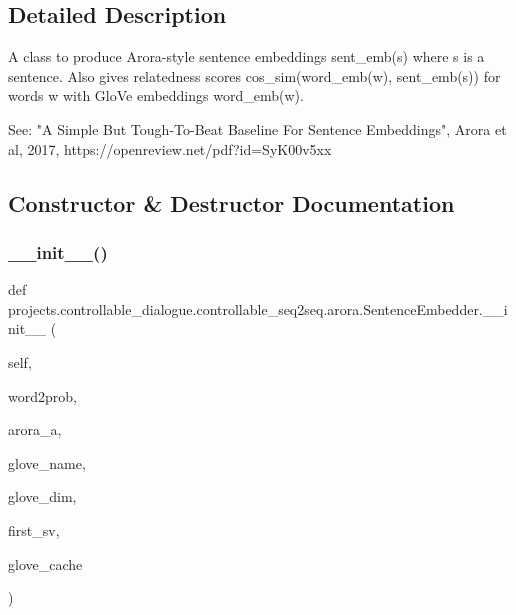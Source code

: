 \subsection{Detailed Description}
\begin{DoxyVerb}A class to produce Arora-style sentence embeddings sent_emb(s) where s is a
sentence. Also gives relatedness scores cos_sim(word_emb(w), sent_emb(s)) for words
w with GloVe embeddings word_emb(w).

See: "A Simple But Tough-To-Beat Baseline For Sentence Embeddings",
Arora et al, 2017, https://openreview.net/pdf?id=SyK00v5xx
\end{DoxyVerb}
 

\subsection{Constructor \& Destructor Documentation}
\mbox{\label{classprojects_1_1controllable__dialogue_1_1controllable__seq2seq_1_1arora_1_1SentenceEmbedder_a13f8aaf805cdc6f2f875855aebed359f}} 
\subsubsection{\texorpdfstring{\+\_\+\+\_\+init\+\_\+\+\_\+()}{\_\_init\_\_()}}
{\footnotesize\ttfamily def projects.\+controllable\+\_\+dialogue.\+controllable\+\_\+seq2seq.\+arora.\+Sentence\+Embedder.\+\_\+\+\_\+init\+\_\+\+\_\+ (\begin{DoxyParamCaption}\item[{}]{self,  }\item[{}]{word2prob,  }\item[{}]{arora\+\_\+a,  }\item[{}]{glove\+\_\+name,  }\item[{}]{glove\+\_\+dim,  }\item[{}]{first\+\_\+sv,  }\item[{}]{glove\+\_\+cache }\end{DoxyParamCaption})}

